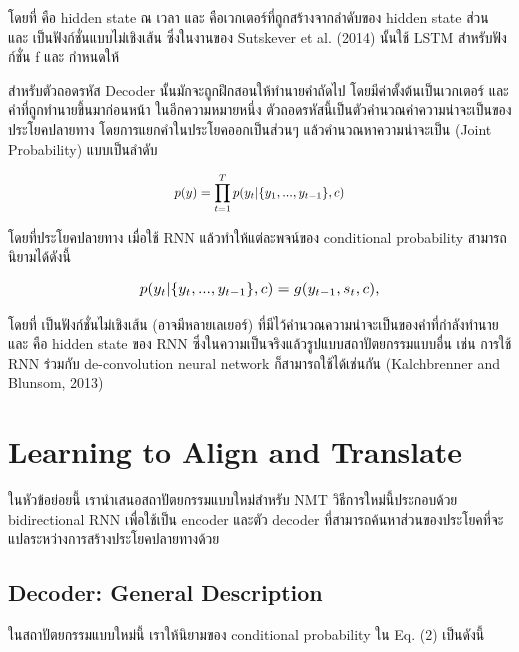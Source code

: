 \documentclass[17pt,fancychapters]{report}
\newcommand{\myeq}[1]{
  \scalebox{1.1}{$ #1 $}
}
\begin{document}
\noindent โดยที่  คือ hidden state ณ เวลา  และ  คือเวกเตอร์ที่ถูกสร้างจากลำดับของ hidden state ส่วน  และ  เป็นฟังก์ชั่นแบบไม่เชิงเส้น ซึ่งในงานของ Sutskever et al. (2014) นั้นใช้ LSTM สำหรับฟังก์ชั่น f และ กำหนดให้     

สำหรับตัวถอดรหัส Decoder นั้นมักจะถูกฝึกสอนให้ทำนายคำถัดไป \myeq{y_t} โดยมีค่าตั้งต้นเป็นเวกเตอร์ \myeq{c} และคำที่ถูกทำนายขึ้นมาก่อนหน้า \myeq{ \{y_1,...,y_{t'-1}\} } ในอีกความหมายหนึ่ง ตัวถอดรหัสนี้เป็นตัวคำนวณค่าความน่าจะเป็นของประโยคปลายทาง \myeq{y} โดยการแยกคำในประโยคออกเป็นส่วนๆ แล้วคำนวณหาความน่าจะเป็น (Joint Probability) แบบเป็นลำดับ


\begin{equation}
  \scaleto{p(y) = \prod_{t=1}^{T} p(y_t | \{y_1,...,y_{t-1}\},c)}{28pt}
\end{equation}

\noindent โดยที่ประโยคปลายทาง \myeq{ y = (y_1,...,y_{T_y}) } เมื่อใช้ RNN แล้วทำให้แต่ละพจน์ของ conditional probability สามารถนิยามได้ดังนี้

\begin{equation}
\myeq{ p(y_t | \{y_t,...,y_{t-1}\},c) = g(y_{t-1},s_t,c), }
\end{equation}

\noindent โดยที่ \myeq{g} เป็นฟังก์ชั่นไม่เชิงเส้น (อาจมีหลายเลเยอร์) ที่มีไว้คำนวณความน่าจะเป็นของคำที่กำลังทำนาย \myeq{y_t} และ \myeq{s_t} คือ hidden state ของ RNN ซึ่งในความเป็นจริงแล้วรูปแบบสถาปัตยกรรมแบบอื่น เช่น การใช้ RNN ร่วมกับ de-convolution neural network ก็สามารถใช้ได้เช่นกัน (Kalchbrenner and Blunsom, 2013)

\section{Learning to Align and Translate}

ในหัวข้อย่อยนี้ เรานำเสนอสถาปัตยกรรมแบบใหม่สำหรับ NMT วิธีการใหม่นี้ประกอบด้วย bidirectional RNN เพื่อใช้เป็น encoder และตัว decoder ที่สามารถค้นหาส่วนของประโยคที่จะแปลระหว่างการสร้างประโยคปลายทางด้วย



\subsection{Decoder: General Description}

ในสถาปัตยกรรมแบบใหม่นี้ เราให้นิยามของ conditional probability ใน Eq. (2) เป็นดังนี้
\end{document}
